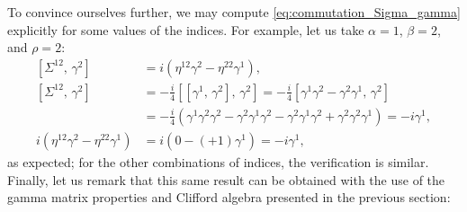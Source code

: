 To convince ourselves further, we may compute \eqref{eq:commutation_Sigma_gamma} explicitly for some values of the indices. For example, let us take \(\alpha = 1\), \(\beta = 2\), and \(\rho = 2\):
\[
    \begin{aligned}
        \left[ \Sigma^{12},\, \gamma^2 \right]                         & = i \left( \eta^{1 2} \gamma^{2} - \eta^{2 2} \gamma^{1} \right),                                                                                              \\
        \left[ \Sigma^{12},\, \gamma^2 \right]                         & = -\frac{i}{4} \left[ [\gamma^{1},\, \gamma^{2}],\, \gamma^2 \right] = -\frac{i}{4} \left[ \gamma^1 \gamma^2 - \gamma^2 \gamma^1,\, \gamma^2 \right]           \\
                                                                       & = -\frac{i}{4} \left( \gamma^1 \gamma^2 \gamma^2 - \gamma^2 \gamma^1 \gamma^2 - \gamma^2 \gamma^1 \gamma^2 + \gamma^2 \gamma^2 \gamma^1 \right) = -i \gamma^1, \\
        i \left( \eta^{1 2} \gamma^{2} - \eta^{2 2} \gamma^{1} \right) & = i \left( 0 - (+1) \gamma^1 \right) = -i \gamma^1,
    \end{aligned}
\]
as expected; for the other combinations of indices, the verification is similar. Finally, let us remark that this same result can be obtained with the use of the gamma matrix properties and Clifford algebra presented in the previous section:
